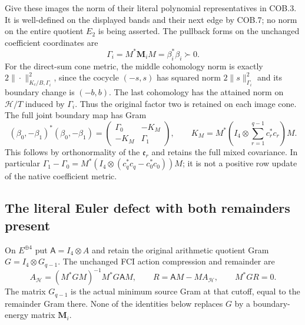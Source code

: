 Give these images the norm of their literal polynomial representatives
in COB.3.  It is well-defined on the displayed bands and their next
edge by COB.7; no norm on the entire quotient $E_2$ is being asserted.
The pullback forms on the unchanged coefficient coordinates are
\[
 \boxed{\Gamma_i=M^*\mathbf M_iM=\beta_i^*\beta_i\succ0.}
 \tag{COB.13}
\]
For the direct-sum cone metric, the middle cohomology norm is exactly
$2\|\cdot\|_{K_c/B,\Gamma_i}^2$, since the cocycle $(-s,s)$
has squared norm $2\|s\|_{\Gamma_i}^2$ and its boundary change is
$(-b,b)$.  The last cohomology has the attained norm on
$\mathcal H/T$ induced by $\Gamma_i$.  Thus the original factor two
is retained on each image cone.  The full joint boundary map has Gram
\[
 (\beta_0,-\beta_1)^*(\beta_0,-\beta_1)=
 \begin{pmatrix}\Gamma_0&-K_M\\-K_M&\Gamma_1\end{pmatrix},\qquad
 K_M=M^*\left(I_4\otimes\sum_{r=1}^{q-1}c_r^*c_r\right)M.
 \tag{COB.14}
\]
This follows by orthonormality of the $\mathfrak e_r$ and retains
the full mixed covariance.  In particular
$\Gamma_1-\Gamma_0=M^*(I_4\otimes(c_q^*c_q-c_0^*c_0))M$;
it is not a positive row update of the native coefficient metric.

\subsection{The literal Euler defect with both remainders present}

On $E^{\oplus4}$ put $\mathsf A=I_4\otimes A$ and retain the
original arithmetic quotient Gram $G=I_4\otimes G_{q-1}$.  The
unchanged FCI action compression and remainder are
\[
 A_{\mathcal H}=(M^*GM)^{-1}M^*G\mathsf AM,\qquad
 R=\mathsf AM-MA_{\mathcal H},\qquad M^*GR=0.
 \tag{COB.15}
\]
The matrix $G_{q-1}$ is the actual minimum source Gram at that
cutoff, equal to the remainder Gram there.  None of the identities
below replaces $G$ by a boundary-energy matrix $\mathbf M_i$.

